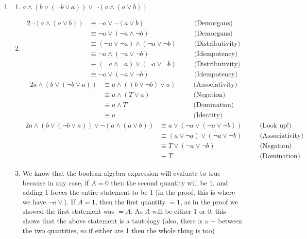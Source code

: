 \documentclass[12pt]{article}
\theoremstyle{definition}
\theoremstyle{remark}
\newcommand{\justif}[1]{&\quad &\text{(#1)}}
\begin{document}
\begin{enumerate}[leftmargin=\labelsep]
	\newpage
	\item 
	\begin{enumerate}
		\item $a \land (b \lor (\lnot b \lor a)) \lor \lnot(a \land (a \lor b))$
		\item \begin{alignat*}{2}
			\lnot (a \land (a \lor b)) &\equiv \lnot a \lor \lnot(a \lor b) \justif{Demorgans} \\
			&\equiv \lnot a \lor (\lnot a \land \lnot b) \justif{Demorgans} \\
			&\equiv (\lnot a \lor \lnot a) \land (\lnot a \lor \lnot b) \justif{Distributivity} \\
			&\equiv \lnot a \land (\lnot a \lor \lnot b) \justif{Idempotency} \\
			&\equiv (\lnot a \land \lnot a) \lor (\lnot a \lor \lnot b) \justif{Distributivity} \\
			&\equiv \lnot a \lor (\lnot a \lor \lnot b) \justif{Idempotency}
		\end{alignat*}
		\begin{alignat*}{2}
			a \land (b \lor (\lnot b \lor a)) &\equiv a \land ((b \lor \lnot b) \lor a) \justif{Associativity} \\
			&\equiv a \land (T \lor a) \justif{Negation} \\
			&\equiv a \land T \justif{Domination} \\
			&\equiv a \justif{Identity}
		\end{alignat*}
		\begin{alignat*}{2}
			a \land (b \lor (\lnot b \lor a)) \lor \lnot(a \land (a \lor b)) &\equiv a \lor (\lnot a \lor (\lnot a \lor \lnot b)) \justif{Look up!} \\
			&\equiv (a \lor \lnot a) \lor (\lnot a \lor \lnot b) \justif{Associativity} \\
			&\equiv T \lor (\lnot a \lor \lnot b) \justif{Negation} \\
			&\equiv T \justif{Domination}
		\end{alignat*}
	\item We know that the boolean algebra expression will evaluate to true because in any case, if $A = 0$ then the second quantity will be $1$, and adding $1$ forces the entire statement to be 1 (in the proof, this is where we have $\lnot a \lor$). If $A = 1$, then the first quantity $= 1$, as in the proof we showed the first statement was $= A$. As $A$ will be either 1 or 0, this shows that the above statement is a tautology (also, there is a $+$ between the two quantities, so if either are 1 then the whole thing is too)
	\end{enumerate}


\end{enumerate}
\end{document}
